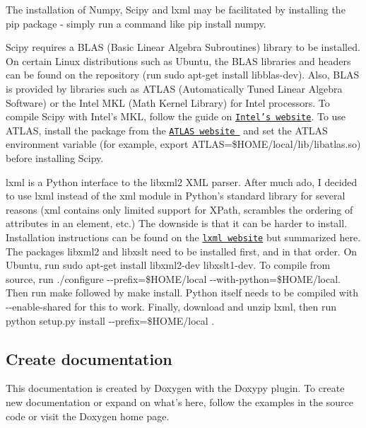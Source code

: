 \begin{DoxyItemize}
\item \-The installation of \-Numpy, \-Scipy and lxml may be facilitated by installing the {\ttfamily pip} package -\/ simply run a command like {\ttfamily pip install numpy}. \item \-Scipy requires a \-B\-L\-A\-S (\-Basic \-Linear \-Algebra \-Subroutines) library to be installed. \-On certain \-Linux distributions such as \-Ubuntu, the \-B\-L\-A\-S libraries and headers can be found on the repository (run {\ttfamily sudo apt-\/get install libblas-\/dev}). \-Also, \-B\-L\-A\-S is provided by libraries such as \-A\-T\-L\-A\-S (\-Automatically \-Tuned \-Linear \-Algebra \-Software) or the \-Intel \-M\-K\-L (\-Math \-Kernel \-Library) for \-Intel processors. \-To compile \-Scipy with \-Intel's \-M\-K\-L, follow the guide on \href{http://software.intel.com/en-us/articles/numpy-scipy-with-mkl}{\tt \-Intel's website}. \-To use \-A\-T\-L\-A\-S, install the package from the \href{http://math-atlas.sourceforge.net}{\tt \-A\-T\-L\-A\-S website } and set the \-A\-T\-L\-A\-S environment variable (for example, {\ttfamily export \-A\-T\-L\-A\-S=\$\-H\-O\-M\-E/local/lib/libatlas.so}) before installing \-Scipy. \item {\ttfamily lxml} is a \-Python interface to the libxml2 \-X\-M\-L parser. \-After much ado, \-I decided to use {\ttfamily lxml} instead of the {\ttfamily xml} module in \-Python's standard library for several reasons ({\ttfamily xml} contains only limited support for \-X\-Path, scrambles the ordering of attributes in an element, etc.) \-The downside is that it can be harder to install. \-Installation instructions can be found on the \href{http://lxml.de/installation.html}{\tt lxml website} but summarized here. \-The packages {\ttfamily libxml2} and {\ttfamily libxslt} need to be installed first, and in that order. \-On \-Ubuntu, run {\ttfamily sudo apt-\/get install libxml2-\/dev libxslt1-\/dev}. \-To compile from source, run {\ttfamily ./configure -\/-\/prefix=\$\-H\-O\-M\-E/local -\/-\/with-\/python=\$\-H\-O\-M\-E/local}. \-Then run {\ttfamily make} followed by {\ttfamily make install}. \-Python itself needs to be compiled with {\ttfamily -\/-\/enable-\/shared} for this to work. \-Finally, download and unzip {\ttfamily lxml}, then run {\ttfamily  python setup.\-py install -\/-\/prefix=\$\-H\-O\-M\-E/local }.\end{DoxyItemize}
\hypertarget{installation_create_doc}{}\subsection{\-Create documentation}\label{installation_create_doc}
\-This documentation is created by \-Doxygen with the \-Doxypy plugin. \-To create new documentation or expand on what's here, follow the examples in the source code or visit the \-Doxygen home page.

